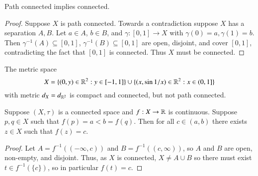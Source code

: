 \begin{prop}\label{prop:3.1.7}
    Path connected implies connected.
\end{prop}
\begin{proof}
    Suppose $X$ is path connected. Towards a contradiction suppose $X$ has a separation $A,B$. Let $a \in A$, $b \in B$, and $\gamma:[0,1]\rightarrow X$ with $\gamma(0) = a,\gamma(1) = b$. Then $\gamma^{-1}(A) \subseteq [0,1]$, $\gamma^{-1}(B) \subseteq [0,1]$ are open, disjoint, and cover $[0,1]$, contradicting the fact that $[0,1]$ is connected. Thus $X$ must be connected.
\end{proof}

\begin{eg}
    The metric space \begin{equation*}
        X = \{(0,y) \in\mathbb R^2:y\in[-1,1]\}\cup\{(x,\sin 1/x)\in \mathbb R^2:x \in (0,1]\}
    \end{equation*}
    with metric $d_X = d_{\mathbb R^2}$ is compact and connected, but not path connected.
\end{eg}

\begin{namthm}
    Suppose $(X,\tau)$ is a connected space and $f:X\rightarrow \mathbb R$ is continuous. Suppose $p,q \in X$ such that $f(p) = a < b = f(q)$. Then for all $c \in (a,b)$ there exists $z \in X$ such that $f(z) = c$.
\end{namthm}
\begin{proof}
    Let $A = f^{-1}((-\infty,c))$ and $B = f^{-1}((c,\infty))$, so $A$ and $B$ are open, non-empty, and disjoint. Thus, as $X$ is connected, $X \neq A \cup B$ so there must exist $t \in f^{-1}(\{c\})$, so in particular $f(t) =c$.
\end{proof}



